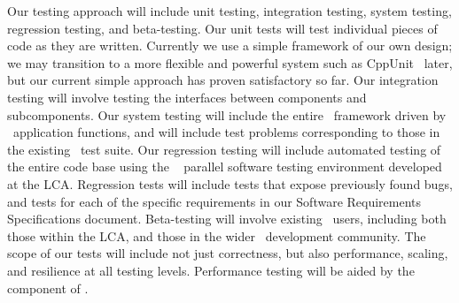 \documentclass[11pt,letterpaper]{article}
\begin{document}
Our testing approach will include unit testing, integration testing,
system testing, regression testing, and beta-testing.  Our unit tests
will test individual pieces of code as they are written.  Currently we
use a simple framework of our own design; we may transition to a more
flexible and powerful system such as CppUnit~\cite{wwwcppunit} later,
but our current simple approach has proven satisfactory so far.  Our
integration testing will involve testing the interfaces between
components and subcomponents.  Our system testing will include the
entire \cello\ framework driven by \enzoii\ application functions, and
will include test problems corresponding to those in the existing
\enzo\ test suite.  Our regression testing will include automated
testing of the entire code base using the \lcatest~\cite{wwwlcatest}
parallel software testing environment developed at the LCA.
Regression tests will include tests that expose previously found bugs,
and tests for each of the specific requirements in our Software
Requirements Specifications document.  Beta-testing will involve
existing \enzo\ users, including both those within the LCA, and those in the
wider \enzo\ development community.  The scope of our tests will
include not just correctness, but also performance, scaling, and
resilience at all testing levels.  Performance testing will be aided
by the  component of \cello.

\end{document}
